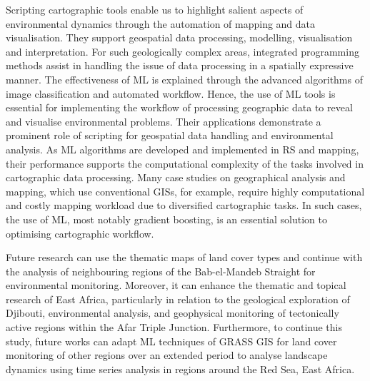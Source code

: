 \documentclass[jimaging,article,accept,pdftex,moreauthors]{Definitions/mdpi}
\begin{document}
Scripting {cartographic} tools{ }enable us to highlight salient aspects of environmental dynamics through the automation of mapping and data visualisation. {They support} geospatial data processing, modelling, visualisation and interpretation. For such geologically complex areas, integrated programming methods assist in handling the issue of data processing in a spatially expressive manner. The{ }effectiveness {of ML }is explained {through} the advanced algorithms of{ }image classification {and automated workflow. }Hence, the use of ML tools is essential for implementing the workflow of processing geographic data to reveal and visualise environmental problems{. }Their applications {demonstrate a} prominent role of{ }scripting for geospatial data handling{ }and{ }environmental analysis. As ML algorithms are developed and implemented in RS and mapping, their performance supports the computational complexity of the tasks involved in cartographic data processing. Many case studies on geographical analysis and mapping, which use conventional GISs, for example, {require highly computational and costly mapping workload} due to diversified cartographic tasks. In such cases, the use of{ }ML, most notably gradient boosting, is an essential solution to optimising cartographic workflow. 

{Future research can use the }thematic maps of land cover types and {continue with the analysis of neighbouring} regions {of the} Bab-el-Mandeb Straight{ }for environmental monitoring. {Moreover, it can} enhance the thematic and topical {research of East Africa, particularly in relation to the geological exploration of Djibouti, environmental analysis, and geophysical monitoring of tectonically active regions within the} %
Afar Triple Junction. {Furthermore, to continue this study, future works can adapt }ML techniques of GRASS GIS{ }for land cover monitoring of {other regions over an extended period }to analyse landscape dynamics {using time series analysis} in regions around the Red Sea, East Africa. %
 
\vspace{6pt}
\end{document}
